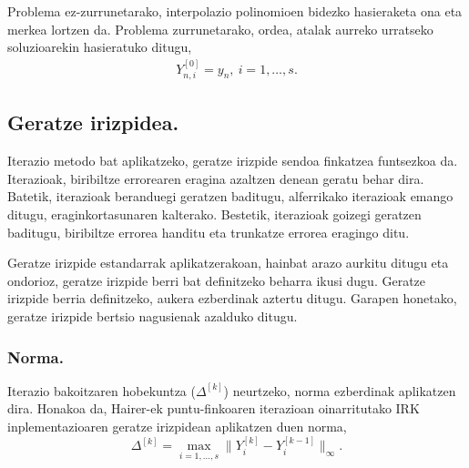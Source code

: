 Problema ez-zurrunetarako, interpolazio polinomioen bidezko hasieraketa ona eta merkea lortzen da. Problema zurrunetarako, ordea, atalak aurreko urratseko soluzioarekin hasieratuko ditugu,
\begin{align*}
Y_{n,i}^{[0]}=y_n, \ i=1,\dots,s.  
\end{align*}
    

\subsection*{Geratze irizpidea.}

Iterazio metodo bat aplikatzeko, geratze irizpide sendoa finkatzea funtsezkoa da.  Iterazioak, biribiltze errorearen eragina azaltzen denean geratu behar dira. Batetik, iterazioak beranduegi geratzen baditugu, alferrikako iterazioak emango ditugu, eraginkortasunaren kalterako. Bestetik, iterazioak goizegi geratzen baditugu, biribiltze errorea handitu eta trunkatze errorea eragingo ditu.  

Geratze irizpide estandarrak aplikatzerakoan, hainbat arazo aurkitu ditugu eta ondorioz, geratze irizpide berri bat definitzeko beharra ikusi dugu. Geratze irizpide berria definitzeko, aukera ezberdinak aztertu ditugu. Garapen honetako, geratze irizpide bertsio nagusienak azalduko ditugu.      

\subsubsection*{Norma.}
Iterazio bakoitzaren hobekuntza ($\Delta^{[k]}$) neurtzeko, norma ezberdinak aplikatzen dira. Honakoa da, Hairer-ek puntu-finkoaren iterazioan oinarritutako IRK inplementazioaren geratze irizpidean aplikatzen duen norma,
\begin{equation*}
\Delta^{[k]}= \max_{i=1,\dots,s} \|Y_i^{[k]}-Y_i^{[k-1]}\|_{\infty}.
\end{equation*}


